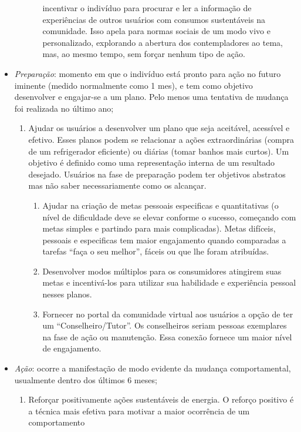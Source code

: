\begin{itemize}
\begin{enumerate}
\begin{enumerate}
incentivar o indivíduo para procurar e ler a informação de experiências de
outros usuários com consumos sustentáveis na comunidade. Isso apela para normas
sociais de um modo vivo e personalizado, explorando a abertura dos
contempladores ao tema, mas, ao mesmo tempo, sem forçar nenhum tipo de ação.
\end{enumerate}
\end{enumerate}
\item \emph{Preparação}: momento em que o indivíduo está pronto para ação no
futuro iminente (medido normalmente como 1 mes), e tem como objetivo desenvolver
e engajar-se a um plano. Pelo menos uma tentativa de mudança foi realizada no
último ano;
\begin{enumerate}
\item Ajudar os usuários a desenvolver um plano que seja aceitável, acessível e
efetivo. Esses planos podem se relacionar a ações extraordinárias (compra de um
refrigerador eficiente) ou diárias (tomar banhos mais curtos). Um objetivo é
definido como uma representação interna de um resultado desejado. Usuários na
fase de preparação podem ter objetivos abstratos mas não saber necessariamente
como os alcançar.
\begin{enumerate}
\item Ajudar na criação de metas pessoais especificas e quantitativas
(o nível de dificuldade deve se elevar conforme o sucesso, começando com metas 
simples e partindo para mais complicadas). Metas difíceis, pessoais e
especificas tem maior engajamento quando comparadas a tarefas ``faça o seu
melhor'', fáceis ou que lhe foram atribuídas.
\item Desenvolver modos múltiplos para os consumidores atingirem suas metas e
incentivá-los para utilizar sua habilidade e experiência pessoal nesses planos.
\item Fornecer no portal da comunidade virtual aos usuários a opção de ter
um ``Conselheiro/Tutor''. Os conselheiros seriam pessoas exemplares na
fase de ação ou manutenção. Essa conexão fornece um maior nível de
engajamento. 
\end{enumerate}
\end{enumerate}
\item \emph{Ação}: ocorre a manifestação de modo evidente da mudança
comportamental, usualmente dentro dos últimos 6 meses;
\begin{enumerate}
\item Reforçar positivamente ações sustentáveis de energia. O reforço positivo é
a técnica mais efetiva para motivar a maior ocorrência de um comportamento

\end{enumerate}
\end{itemize}
